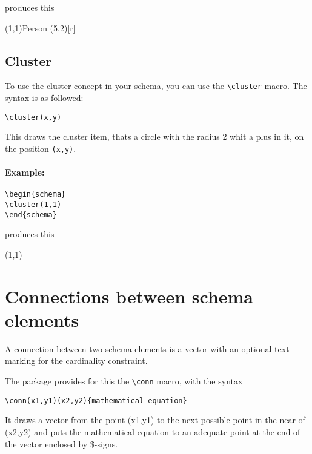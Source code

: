 \documentclass[a4paper,11pt]{article}
\begin{document}
produces this

\begin{schema}
\entity(1,1){Person}
\attr(5,2)[r]{}
\end{schema}

\subsection{Cluster}

To use the cluster concept in your schema, you can use the \verb|\cluster| macro.
The syntax is as followed:

\begin{verbatim}
\cluster(x,y)
\end{verbatim}

This draws the cluster item, thats a circle with the radius 2 whit a plus in it, on the position 
{\tt (x,y)}.

\paragraph{Example:}

\begin{verbatim}
\begin{schema}
\cluster(1,1)
\end{schema}

\end{verbatim}

produces this

\begin{schema}
\cluster(1,1)
\end{schema}

\section{Connections between schema elements}

A connection between two schema elements is a vector with an optional
text marking for the cardinality constraint.

The package provides for this the \verb|\conn| macro, with the syntax

\begin{verbatim}
\conn(x1,y1)(x2,y2){mathematical equation}
\end{verbatim}

It draws a vector from the point (x1,y1) to the next possible point in the near
of (x2,y2) and puts the mathematical equation to an adequate point at the end of the 
vector enclosed by \$-signs. 
\end{document}
